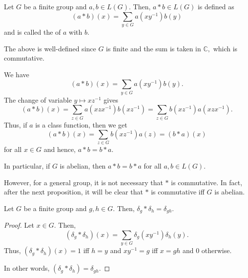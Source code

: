\begin{defn}
    Let $G$ be a finite group and $a, b \in L(G).$ Then, $a * b \in L(G)$ is defined as
    \begin{equation*}
        (a * b)(x) = \sum_{y \in G} a(xy^{-1})b(y)
    \end{equation*}
    and is called the  of $a$ with $b.$
\end{defn}

The above is well-defined since $G$ is finite and the sum is taken in $\mathbb{C},$ which is commutative. 

\begin{rem} \label{rem:classfunctionincenter}
    We have
    \begin{equation*}
        (a * b)(x) = \sum_{y \in G} a(xy^{-1})b(y).
    \end{equation*}
    The change of variable $y \mapsto xz^{-1}$ gives
    \begin{equation*}
        (a * b)(x) = \sum_{z \in G} a(xzx^{-1})b(xz^{-1}) = \sum_{z \in G} b(xz^{-1})a(xzx^{-1}).
    \end{equation*}
    Thus, if $a$ is a class function, then we get
    \begin{equation*}
        (a * b)(x) = \sum_{z \in G} b(xz^{-1})a(z) = (b * a)(x)
    \end{equation*}
    for all $x \in G$ and hence, $a * b = b * a.$
    
    In particular, if $G$ is abelian, then $a * b = b * a$ for all $a, b \in L(G).$
    
    However, for a general group, it is not necessary that $*$ is commutative. In fact, after the next proposition, it will be clear that $*$ is commutative iff $G$ is abelian.
\end{rem}

\begin{prop} \label{prop:convdeltaprod}
    Let $G$ be a finite group and $g, h \in G.$ Then, $\delta_g * \delta_h = \delta_{gh}.$
\end{prop}
\begin{proof}
    Let $x \in G.$ Then,
    \begin{equation*}
        (\delta_g * \delta_h)(x) = \sum_{y \in G} \delta_g(xy^{-1})\delta_h(y).
    \end{equation*}
    Thus, $(\delta_g * \delta_h)(x) = 1$ iff $h = y$ and $xy^{-1} = g$ iff $x = gh$ and $0$ otherwise.
    
    In other words, $(\delta_g * \delta_h) = \delta_{gh}.$
\end{proof}

